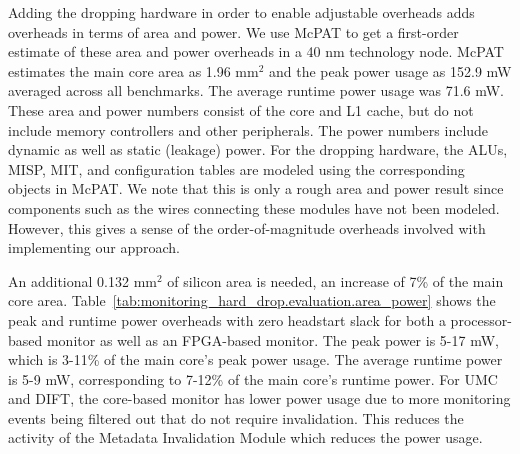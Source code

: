 Adding the dropping hardware in order to enable adjustable overheads adds
overheads in terms of area and power. We use McPAT \cite{mcpat-micro09} to get
a first-order estimate of these area and power overheads in a 40 nm technology
node. McPAT estimates the main core area as 1.96 mm$^2$ and the peak power
usage as 152.9 mW averaged across all benchmarks. The average runtime power
usage was 71.6 mW. These area and power numbers consist of the core and L1
cache, but do not include memory controllers and other peripherals. The power
numbers include dynamic as well as static (leakage) power. For the dropping
hardware, the ALUs, MISP, MIT, and configuration tables are modeled using the
corresponding objects in McPAT. We note that this is only a rough area and
power result since components such as the wires connecting these modules have
not been modeled. However, this gives a sense of the order-of-magnitude
overheads involved with implementing our approach.

An additional 0.132 mm$^2$ of silicon area is needed, an increase of 7\% of the
main core area. Table~\ref{tab:monitoring_hard_drop.evaluation.area_power}
shows the peak and runtime power overheads with zero headstart slack for both a
processor-based monitor as well as an FPGA-based monitor. The peak power is
5-17 mW, which is 3-11\% of the main core's peak power usage. The average
runtime power is 5-9 mW, corresponding to 7-12\% of the main core's runtime
power. For UMC and DIFT, the core-based monitor has lower power usage due to
more monitoring events being filtered out that do not require invalidation.
This reduces the activity of the Metadata Invalidation Module which reduces the
power usage.

